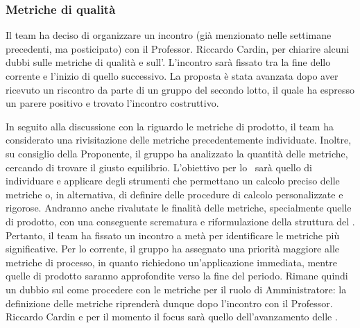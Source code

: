\subsubsection{Metriche di qualità}
\par Il team ha deciso di organizzare un incontro (già menzionato nelle settimane precedenti, ma posticipato) con il Professor. Riccardo Cardin, per chiarire alcuni dubbi sulle metriche di qualità e sull'\AdR. L'incontro sarà fissato tra la fine dello  corrente e l'inizio di quello successivo.
La proposta è stata avanzata dopo aver ricevuto un riscontro da parte di un gruppo del secondo lotto, il quale ha espresso un parere positivo e trovato l'incontro costruttivo.
\par In seguito alla discussione con la  riguardo le metriche di prodotto, il team ha considerato una rivisitazione delle metriche precedentemente individuate. Inoltre, su consiglio della Proponente, il gruppo ha analizzato la quantità delle metriche, cercando di trovare il giusto equilibrio.
L'obiettivo per lo \ sarà quello di individuare e applicare degli strumenti che permettano un calcolo preciso delle metriche o, in alternativa, di definire delle procedure di calcolo personalizzate e rigorose. 
Andranno anche rivalutate le finalità delle metriche, specialmente quelle di prodotto, con una conseguente scrematura e riformulazione della struttura del \PdQ.
Pertanto, il team ha fissato un incontro a metà  per identificare le metriche più significative.
Per lo  corrente, il gruppo ha assegnato una priorità maggiore alle metriche di processo, in quanto richiedono un'applicazione immediata, mentre quelle di prodotto saranno approfondite verso la fine del periodo.
Rimane quindi un dubbio sul come procedere con le metriche per il ruolo di Amministratore: la definizione delle metriche riprenderà dunque dopo l'incontro con il Professor. Riccardo Cardin e per il momento il focus sarà quello dell'avanzamento delle \NdP.
